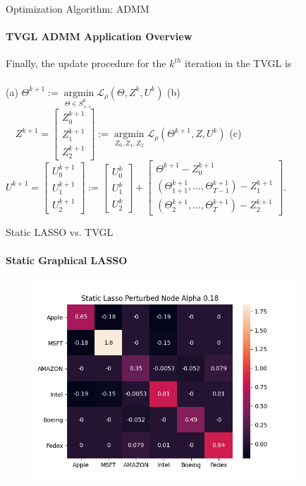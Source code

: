 \documentclass{beamer}
\begin{document}
\begin{frame}{Optimization Algorithm: ADMM}
\framesubtitle{TVGL ADMM Application Overview}

Finally, the update procedure for the $k^{th}$ iteration in the TVGL is

\begin{align}
  
\end{align}
(a) $\Theta^{k+1}:=\underset{\Theta \in S_{++}^{p}}{\operatorname{argmin}} \mathcal{L}_{\rho}\left(\Theta, Z^{k}, U^{k}\right)$
(b) $\quad Z^{k+1}=\left[\begin{array}{c}Z_{0}^{k+1} \\ Z_{1}^{k+1} \\ Z_{2}^{k+1}\end{array}\right]:=\underset{Z_{0}, Z_{1}, Z_{2}}{\operatorname{argmin}} \mathcal{L}_{\rho}\left(\Theta^{k+1}, Z, U^{k}\right)$
(c) $U^{k+1}=\left[\begin{array}{c}U_{0}^{k+1} \\ U_{1}^{k+1} \\ U_{2}^{k+1}\end{array}\right]:=\left[\begin{array}{c}U_{0}^{k} \\ U_{1}^{k} \\ U_{2}^{k}\end{array}\right]+\left[\begin{array}{c}\Theta^{k+1}-Z_{0}^{k+1} \\ \left(\Theta_{1+1}^{k+1}, \ldots, \Theta_{T-1}^{k+1}\right)-Z_{1}^{k+1} \\ \left(\Theta_{2}^{k+1}, \ldots, \Theta_{T}^{k+1}\right)-Z_{2}^{k+1}\end{array}\right]$. 

\end{frame}

\begin{frame}{Static LASSO vs. TVGL}
\framesubtitle{Static Graphical LASSO}

  \begin{figure}
    \includegraphics[width=10cm]{Static_Psi5_alpha0.18.png}
  \end{figure}

\end{frame}
\end{document}
